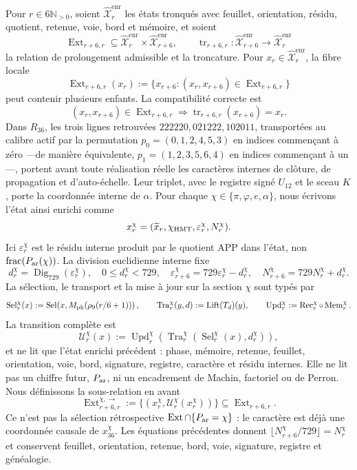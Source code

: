 Pour \(r\in6\mathbb N_{>0}\), soient
\(\widehat{\mathcal X}^{\mathrm{enr}}_r\) les états tronqués avec feuillet,
orientation, résidu, quotient, retenue, voie, bord et mémoire, et soient
\[
 \operatorname{Ext}_{r+6,r}\subseteq
 \widehat{\mathcal X}^{\mathrm{enr}}_r\times
 \widehat{\mathcal X}^{\mathrm{enr}}_{r+6},
 \qquad
 \operatorname{tr}_{r+6,r}:
 \widehat{\mathcal X}^{\mathrm{enr}}_{r+6}
 \longrightarrow
 \widehat{\mathcal X}^{\mathrm{enr}}_r
\]
la relation de prolongement admissible et la troncature. Pour
\(x_r\in\widehat{\mathcal X}^{\mathrm{enr}}_r\), la fibre locale
\[
 \operatorname{Ext}_{r+6,r}(x_r)
 :=\{x_{r+6}:(x_r,x_{r+6})\in\operatorname{Ext}_{r+6,r}\}
\]
peut contenir plusieurs enfants. La compatibilité correcte est
\[
 (x_r,x_{r+6})\in\operatorname{Ext}_{r+6,r}
 \Longrightarrow
 \operatorname{tr}_{r+6,r}(x_{r+6})=x_r.
\]
Dans \(R_{36}\), les trois lignes retrouvées
\(222220,021222,102011\), transportées au calibre actif par la permutation
\(p_0=(0,1,2,4,5,3)\) en indices commençant à zéro ---de manière équivalente,
\(p_1=(1,2,3,5,6,4)\) en indices commençant à un---, portent avant toute
réalisation réelle les caractères
internes de clôture, de propagation et d'auto-échelle. Leur triplet, avec le
registre signé \(U_{12}\) et le sceau \(K\), porte la coordonnée interne de
\(\alpha\). Pour chaque
\(\chi\in\{\pi,\varphi,e,\alpha\}\), nous écrivons l'état ainsi enrichi
comme
\[
 x_r^\chi=(\widetilde x_r,\chi_{\rm HMT},
            \varepsilon_r^\chi,N_r^\chi).
\]
Ici \(\varepsilon_r^\chi\) est le résidu interne produit par le quotient
APP dans l'état, non \(\operatorname{frac}(P_{\rm ar}(\chi))\). La division
euclidienne interne fixe
\[
 d_r^\chi=\operatorname{Dig}_{729}(\varepsilon_r^\chi),
 \quad 0\le d_r^\chi<729,
 \quad
 \varepsilon_{r+6}^\chi=729\varepsilon_r^\chi-d_r^\chi,
 \quad
 N_{r+6}^\chi=729N_r^\chi+d_r^\chi.
\]
La sélection, le transport et la mise à jour sur la section
\(\chi\) sont typés par
\[
 \operatorname{Sel}_r^\chi(x)
 :=\operatorname{Sel}\!\left(
 x,M_{\rm ph}(\rho_9(r/6+1))\right),
 \qquad
 \operatorname{Tra}_r^\chi(y,d):=\operatorname{Lift}(T_d)(y),
 \qquad
 \operatorname{Upd}_r^\chi:=\operatorname{Rec}_r^\chi\circ
 \operatorname{Mem}_r^\chi.
\]
La transition complète est
\[
 \mathcal U_r^\chi(x)
 :=\operatorname{Upd}_r^\chi\!\left(
  \operatorname{Tra}_r^\chi\!\left(
   \operatorname{Sel}_r^\chi(x),d_r^\chi
  \right)\right),
\]
et ne lit que l'état enrichi précédent : phase, mémoire, retenue, feuillet,
orientation, voie, bord, signature, registre, caractère et résidu internes.
Elle ne lit pas un chiffre futur, \(P_{\rm ar}\), ni un encadrement de Machin,
factoriel ou de Perron. Nous définissons la sous-relation en avant
\[
 \operatorname{Ext}^{\chi,\rightarrow}_{r+6,r}
 :=\{(x_r^\chi,\mathcal U_r^\chi(x_r^\chi))\}
 \subseteq\operatorname{Ext}_{r+6,r}.
\]
Ce n'est pas la sélection rétrospective
\(\operatorname{Ext}\cap\{P_{\rm ar}=\chi\}\) : le caractère est déjà une
coordonnée causale de \(x_{36}^\chi\). Les équations précédentes donnent
\(\lfloor N_{r+6}^\chi/729\rfloor=N_r^\chi\) et conservent feuillet, orientation,
retenue, bord, voie, signature, registre et généalogie.


